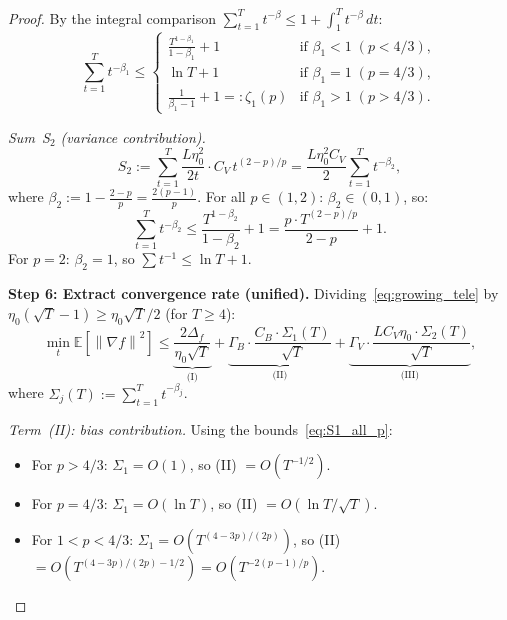 \documentclass[11pt]{article}
\theoremstyle{definition}
\newcommand{\E}{\mathbb{E}}
\newcommand{\norm}[1]{\left\| #1 \right\|}
\begin{document}
\begin{proof}
By the integral comparison $\sum_{t=1}^T t^{-\beta}
\leq 1 + \int_1^T t^{-\beta}\,dt$:
\begin{equation}\label{eq:S1_all_p}
  \sum_{t=1}^T t^{-\beta_1} \leq
  \begin{cases}
    \frac{T^{1-\beta_1}}{1-\beta_1} + 1
      & \text{if } \beta_1 < 1 \;(p < 4/3), \\[4pt]
    \ln T + 1
      & \text{if } \beta_1 = 1 \;(p = 4/3), \\[4pt]
    \frac{1}{\beta_1 - 1} + 1 =: \zeta_1(p)
      & \text{if } \beta_1 > 1 \;(p > 4/3).
  \end{cases}
\end{equation}

\emph{Sum~S$_2$ (variance contribution).}
\[
  S_2 := \sum_{t=1}^T \frac{L\eta_0^2}{2t} \cdot C_V\, t^{(2-p)/p}
  = \frac{L\eta_0^2 C_V}{2} \sum_{t=1}^T t^{-\beta_2},
\]
where $\beta_2 := 1 - \frac{2-p}{p} = \frac{2(p-1)}{p}$.
For all $p \in (1, 2)$: $\beta_2 \in (0, 1)$, so:
\begin{equation}\label{eq:S2_bound}
  \sum_{t=1}^T t^{-\beta_2} \leq \frac{T^{1-\beta_2}}{1-\beta_2} + 1
  = \frac{p \cdot T^{(2-p)/p}}{2-p} + 1.
\end{equation}
For $p = 2$: $\beta_2 = 1$, so $\sum t^{-1} \leq \ln T + 1$.

\textbf{Step 6: Extract convergence rate (unified).}
Dividing~\eqref{eq:growing_tele} by $\eta_0(\sqrt{T}-1) \geq \eta_0\sqrt{T}/2$
(for $T \geq 4$):
\begin{equation}\label{eq:growing_three_terms}
  \min_t \E[\norm{\nabla f}^2] \leq
  \underbrace{\frac{2\Delta_f}{\eta_0\sqrt{T}}}_{\text{(I)}}
  + \underbrace{\Gamma_B \cdot \frac{C_B \cdot \Sigma_1(T)}{\sqrt{T}}}_{\text{(II)}}
  + \underbrace{\Gamma_V \cdot \frac{LC_V\eta_0 \cdot \Sigma_2(T)}{\sqrt{T}}}_{\text{(III)}},
\end{equation}
where $\Sigma_j(T) := \sum_{t=1}^T t^{-\beta_j}$.

\emph{Term~(II): bias contribution.}
Using the bounds~\eqref{eq:S1_all_p}:
\begin{itemize}[noitemsep]
  \item For $p > 4/3$: $\Sigma_1 = O(1)$, so (II) $= O(T^{-1/2})$.
  \item For $p = 4/3$: $\Sigma_1 = O(\ln T)$, so (II) $= O(\ln T / \sqrt{T})$.
  \item For $1 < p < 4/3$: $\Sigma_1 = O(T^{(4-3p)/(2p)})$, so
    (II) $= O(T^{(4-3p)/(2p) - 1/2}) = O(T^{-2(p-1)/p})$.
\end{itemize}


\end{proof}
\end{document}
